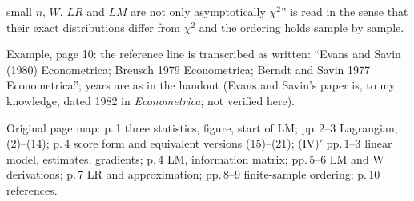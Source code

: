\documentclass[11pt]{article}
\begin{document}
\begin{transcriptnotes}
       small $n$, $W$, $LR$ and $LM$ are not only asymptotically $\chi^{2}$'' is read in the sense that their
       exact distributions differ from $\chi^{2}$ and the ordering holds sample by sample.
 \item Example, page 10: the reference line is transcribed as written: ``Evans and Savin (1980) Econometrica; Breusch 1979
       Econometrica; Berndt and Savin 1977 Econometrica''; years are as in the handout (Evans and Savin's
       paper is, to my knowledge, dated 1982 in \emph{Econometrica}; not verified here).
 \item Original page map: p.\,1 three statistics, figure, start of LM; pp.\,2--3 Lagrangian, (2)--(14);
       p.\,4 score form and equivalent versions (15)--(21); (IV)$'$ pp.\,1--3 linear model, estimates, gradients;
       p.\,4 LM, information matrix; pp.\,5--6 LM and W derivations; p.\,7 LR and approximation; pp.\,8--9
       finite-sample ordering; p.\,10 references.
\end{transcriptnotes}
\end{document}
